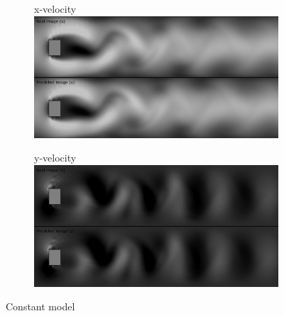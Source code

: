 \documentclass{llncs}
\begin{document}
\begin{figure}
  
  \begin{subfigure}{.5\textwidth}
    \centering
    \large{x-velocity}
    \includegraphics[width=1\linewidth]{imgs/single_constant_x}
  \end{subfigure}
  \begin{subfigure}{.5\textwidth}
    \centering
    \large{y-velocity}
    \includegraphics[width=1\linewidth]{imgs/single_constant_y}
  \end{subfigure}
  \begin{center}
    Constant model
  \end{center}


\end{figure}
\end{document}
